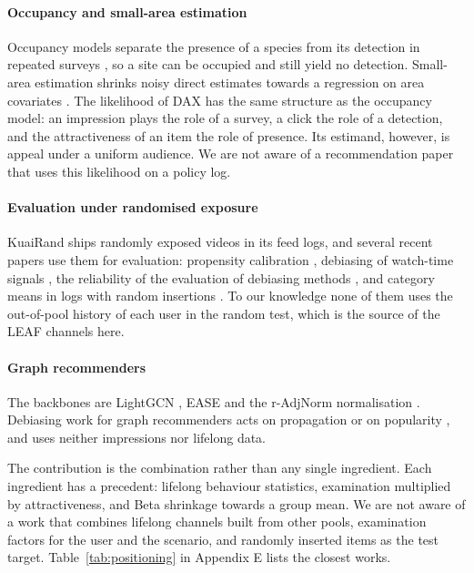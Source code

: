 \paragraph{Occupancy and small-area estimation} Occupancy models separate the presence of a species from its detection in repeated
surveys \citep{mackenzie2002occupancy}, so a site can be occupied and still yield no detection. Small-area estimation shrinks noisy
direct estimates towards a regression on area covariates \citep{fay1979smallarea}. The likelihood of DAX has the same structure as
the occupancy model: an impression plays the role of a survey, a click the role of a detection, and the attractiveness of an item
the role of presence. Its estimand, however, is appeal under a uniform audience. We are not aware of a recommendation paper that
uses this likelihood on a policy log.

\paragraph{Evaluation under randomised exposure} KuaiRand \citep{gao2022kuairand} ships randomly exposed videos in its feed logs, and
several recent papers use them for evaluation: propensity calibration \citep{hu2025uncertainty}, debiasing of watch-time signals
\citep{zhao2023d2co}, the reliability of the evaluation of debiasing methods \citep{wang2025debiasunreliable}, and category means in
logs with random insertions \citep{zhang2026categorymeans}. To our knowledge none of them uses the out-of-pool history of each user in
the random test, which is the source of the LEAF channels here.

\paragraph{Graph recommenders} The backbones are LightGCN \citep{he2020lightgcn}, EASE \citep{steck2019ease} and the r-AdjNorm
normalisation \citep{zhao2022radjnorm}. Debiasing work for graph recommenders acts on propagation or on popularity
\citep{kim2022navip,zhang2021pda}, and uses neither impressions nor lifelong data.

The contribution is the combination rather than any single ingredient. Each ingredient has a precedent: lifelong behaviour
statistics, examination multiplied by attractiveness, and Beta shrinkage towards a group mean. We are not aware of a work that
combines lifelong channels built from other pools, examination factors for the user and the scenario, and randomly inserted items as
the test target. Table~\ref{tab:positioning} in Appendix E lists the closest works.
